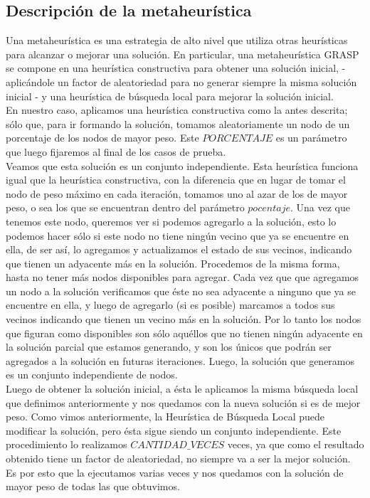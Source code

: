 \documentclass[a4paper, 10pt]{article}
\begin{document}
\subsection{Descripci\'on de la metaheur\'istica}
Una metaheur\'istica es una estrategia de alto nivel que utiliza otras heur\'isticas para alcanzar o mejorar una soluci\'on. En particular, una metaheur\'istica GRASP se compone en una heur\'istica constructiva para obtener una soluci\'on inicial, - aplic\'andole un factor de aleatoriedad para no generar siempre la misma soluci\'on inicial - y una heur\'istica de b\'usqueda local para mejorar la soluci\'on inicial. \\

En nuestro caso, aplicamos una heur\'istica constructiva como la antes descrita; s\'olo que, para ir formando la soluci\'on, tomamos aleatoriamente un nodo de un porcentaje de los nodos de mayor peso. Este $PORCENTAJE$ es un par\'ametro que luego fijaremos al final de los casos de prueba. \\

Veamos que esta soluci\'on es un conjunto independiente. Esta heur\'istica funciona igual que la heur\'istica constructiva, con la diferencia que en lugar de tomar el nodo de peso m\'aximo en cada iteraci\'on, tomamos uno al azar de los de mayor peso, o sea los que se encuentran dentro del par\'ametro $pocentaje$. Una vez que tenemos este nodo, queremos ver si podemos agregarlo a la soluci\'on, esto lo podemos hacer s\'olo si este nodo no tiene ning\'un vecino que ya se encuentre en ella, de ser as\'i, lo agregamos y actualizamos el estado de sus vecinos, indicando que tienen un adyacente m\'as en la soluci\'on. Procedemos de la misma forma, hasta no tener m\'as nodos disponibles para agregar. Cada vez que que agregamos un nodo a la soluci\'on verificamos que \'este no sea adyacente a ninguno que ya se encuentre en ella, y luego de agregarlo (si es posible) marcamos a todos sus vecinos indicando que tienen un vecino m\'as en la soluci\'on. Por lo tanto los nodos que figuran como disponibles son s\'olo aqu\'ellos que no tienen ning\'un adyacente en la soluci\'on parcial que estamos generando, y son los \'unicos que podr\'an ser agregados a la soluci\'on en futuras iteraciones. Luego, la soluci\'on que generamos es un conjunto independiente de nodos. \\

Luego de obtener la soluci\'on inicial, a \'esta le aplicamos la misma b\'usqueda local que definimos anteriormente y nos quedamos con la nueva soluci\'on si es de mejor peso. Como vimos anteriormente, la Heur\'istica de B\'usqueda Local puede modificar la soluci\'on, pero \'esta sigue siendo un conjunto independiente. Este procedimiento lo realizamos $CANTIDAD\_VECES$ veces, ya que como el resultado obtenido tiene un factor de aleatoriedad, no siempre va a ser la mejor soluci\'on. Es por esto que la ejecutamos varias veces y nos quedamos con la soluci\'on de mayor peso de todas las que obtuvimos. \\
\end{document}
